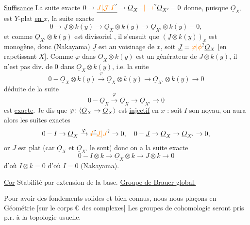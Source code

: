 \uline{Suffisance} La suite exacte $0\to\underline{\unsure{J|\mathcal{J}|I}}\to\underline{O}_X\unsure{-|\to}\underline{O}_{X'}-0$ donne, puisque $\underline{O}_{X'}$ est $Y$-plat \uline{en $x$}, la suite exacte
\[
0\to\underline{J}\otimes k(y)\to\underline{O}_X\otimes k(y)\to\underline{O}_{X'}\otimes k(y)-0,
\]
et comme $\underline{O}_{X'}\otimes k(y)$ est divisoriel , il s'ensuit que $(\underline{J}\otimes k(y))_x$ est monogène, donc (Nakayama) $\underline{J}$  est   au voisinage de $x$, soit $\underline{J}=\unsure{\varphi|\phi}\underline{O}_X$ [en rapetissant $X$]. Comme $\varphi$ dans $\underline{O}_X\otimes k(y)$ est un générateur de $\underline{J}\otimes k(y)$, il n'est pas div. de $0$ dans $\underline{O}_X\otimes k(y)$, i.e. la suite
\[
0-\underline{O}_X\otimes k(y)\xrightarrow{\varphi}\underline{O}_X\otimes k(y)\to\underline{O}_{X'}\otimes k(y)\to0
\]
déduite de la suite
\[
0-\underline{O}_X\xrightarrow{\varphi}\underline{O}_X\to\underline{O}_{X'}\to0
\]
est \uline{exacte}. Je dis que $\varphi\colon\inserted{\underline{O}_X\to\underline{O}_X}$ est \uline{injectif} en $x$ : soit $I$ son noyau, on aura alors les suites exactes
\[
0-I\to\underline{O}_X\xrightarrow{\varphi}\deleted{\unsure{I}}\unsure{\underline{J}|J}\to0,\quad 0-\underline{J}\to\underline{O}_X\to\underline{O}_{X'}\to0,
\]
or $J$ est plat (car $\underline{O}_X$ et $\underline{O}_{X'}$ le sont) donc on a la suite exacte
\[
0-I\otimes k\to\underline{O}_X\otimes k\to J\otimes k\to0
\]
d'où $I\otimes k=0$ d'où $I=0$ (Nakayama). 

\uline{Cor} Stabilité par extension de la base.
\uline{Groupe de Brauer global.}

Pour avoir des fondements solides et bien connus, nous nous plaçons en Géométrie   [sur le corps $\mathbb{C}$ des complexes] Les groupes de cohomologie seront pris p.r. à la topologie usuelle.

